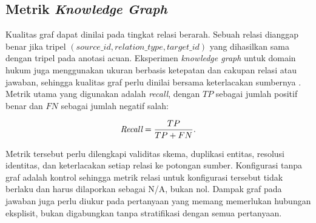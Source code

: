 \subsection{Metrik \emph{Knowledge Graph}}

Kualitas graf dapat dinilai pada tingkat relasi berarah. Sebuah relasi dianggap benar jika tripel $(source\_id,relation\_type,target\_id)$ yang dihasilkan sama dengan tripel pada anotasi acuan. Eksperimen \emph{knowledge graph} untuk domain hukum juga menggunakan ukuran berbasis ketepatan dan cakupan relasi atau jawaban, sehingga kualitas graf perlu dinilai bersama keterlacakan sumbernya \parencite{muninggarLexIDMetadataSemantic2023}. Metrik utama yang digunakan adalah \emph{recall}, dengan $TP$ sebagai jumlah positif benar dan $FN$ sebagai jumlah negatif salah:

\begin{equation}
    \operatorname{\emph{Recall}}=\frac{TP}{TP+FN}.
\end{equation}

Metrik tersebut perlu dilengkapi validitas skema, duplikasi entitas, resolusi identitas, dan keterlacakan setiap relasi ke potongan sumber. Konfigurasi tanpa graf adalah kontrol sehingga metrik relasi untuk konfigurasi tersebut tidak berlaku dan harus dilaporkan sebagai N/A, bukan nol. Dampak graf pada jawaban juga perlu diukur pada pertanyaan yang memang memerlukan hubungan eksplisit, bukan digabungkan tanpa stratifikasi dengan semua pertanyaan.
